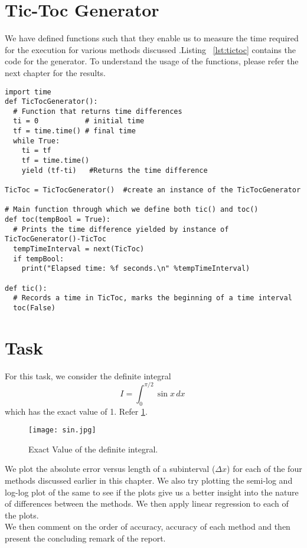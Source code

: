 \documentclass[a4paper, 12pt]{report}
\begin{document}
\section{Tic-Toc Generator}
We have defined functions such that they enable us to measure the time required for the execution for various methods discussed .Listing ~\ref{lst:tictoc} contains the code for the generator. To understand the usage of the functions, please refer the next chapter for the results.
\begin{lstlisting}
import time
def TicTocGenerator():
  # Function that returns time differences
  ti = 0           # initial time
  tf = time.time() # final time
  while True:
    ti = tf
    tf = time.time()
    yield (tf-ti)   #Returns the time difference

TicToc = TicTocGenerator()  #create an instance of the TicTocGenerator

# Main function through which we define both tic() and toc()
def toc(tempBool = True):
  # Prints the time difference yielded by instance of TicTocGenerator()-TicToc
  tempTimeInterval = next(TicToc)
  if tempBool:
    print("Elapsed time: %f seconds.\n" %tempTimeInterval)

def tic():
  # Records a time in TicToc, marks the beginning of a time interval
  toc(False)
\end{lstlisting}
    \section{Task}
    For this task, we consider the definite integral
    \begin{equation}
        I = \int_{0}^{\pi/2}\sin{x}\,dx\
        \label{eqn:integral}
    \end{equation}
    which has the exact value of 1. Refer \ref{fig:sin}.
    \begin{figure}[h]
    \centering
    \texttt{[image: sin.jpg]}
    \caption{Exact Value of the definite integral.}
    \label{fig:sin}
    \end{figure}
    We plot the absolute error versus length of a subinterval ($\Delta x$) for each of the four methods discussed earlier in this chapter. We also try plotting the semi-log and log-log plot of the same to see if the plots give us a better insight into the nature of differences between the methods. We then apply linear regression to each of the plots.\\
    We then comment on the order of accuracy, accuracy of each method and then present the concluding remark of the report.
    
\end{document}
